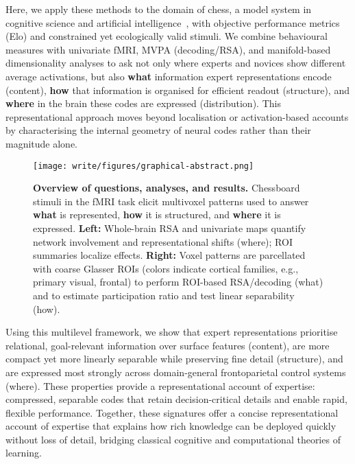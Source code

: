 \documentclass[preprint,12pt]{elsarticle}
\begin{document}
Here, we apply these methods to the domain of chess, a model system in cognitive science and artificial intelligence~\cite{Chase1973,mccarthy1990chess}, with objective performance metrics (Elo) and constrained yet ecologically valid stimuli. We combine behavioural measures with univariate fMRI, MVPA (decoding/RSA), and manifold-based dimensionality analyses to ask not only where experts and novices show different average activations, but also \textbf{what} information expert representations encode (content), \textbf{how} that information is organised for efficient readout (structure), and \textbf{where} in the brain these codes are expressed (distribution). This representational approach moves beyond localisation or activation-based accounts by characterising the internal geometry of neural codes rather than their magnitude alone.

\begin{figure}[!tp]
  \centering
  \texttt{[image: write/figures/graphical-abstract.png]}
  \caption{
    \textbf{Overview of questions, analyses, and results.}
    Chessboard stimuli in the fMRI task elicit multivoxel patterns used to answer \textbf{what} is represented, \textbf{how} it is structured, and \textbf{where} it is expressed. \textbf{Left:} Whole-brain RSA and univariate maps quantify network involvement and representational shifts (where); ROI summaries localize effects. \textbf{Right:} Voxel patterns are parcellated with coarse Glasser ROIs (colors indicate cortical families, e.g., primary visual, frontal) to perform ROI-based RSA/decoding (what) and to estimate participation ratio and test linear separability (how).}
      \label{fig:analysis_summary}
\end{figure}

Using this multilevel framework, we show that expert representations prioritise relational, goal-relevant information over surface features (content), are more compact yet more linearly separable while preserving fine detail (structure), and are expressed most strongly across domain-general frontoparietal control systems (where). These properties provide a representational account of expertise: compressed, separable codes that retain decision-critical details and enable rapid, flexible performance. Together, these signatures offer a concise representational account of expertise that explains how rich knowledge can be deployed quickly without loss of detail, bridging classical cognitive and computational theories of learning.
\end{document}
